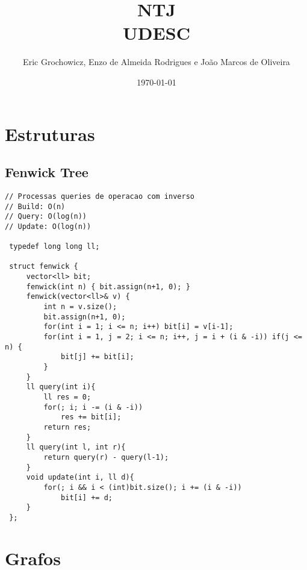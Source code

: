 \documentclass[11pt, a4paper, twoside]{article}
\title{NTJ \\ UDESC}
\author{Eric Grochowicz, Enzo de Almeida Rodrigues e João Marcos de Oliveira}
\begin{document}
\twocolumn
\date{\today}
\maketitle


\renewcommand{\contentsname}{Índice} %
\tableofcontents


%
%

\section{Estruturas}

\subsection{Fenwick Tree}
\begin{lstlisting}
// Processas queries de operacao com inverso
// Build: O(n)
// Query: O(log(n))
// Update: O(log(n))

 typedef long long ll;
 
 struct fenwick {
     vector<ll> bit;
     fenwick(int n) { bit.assign(n+1, 0); }
     fenwick(vector<ll>& v) {
         int n = v.size();
         bit.assign(n+1, 0);
         for(int i = 1; i <= n; i++) bit[i] = v[i-1];
         for(int i = 1, j = 2; i <= n; i++, j = i + (i & -i)) if(j <= n) {
             bit[j] += bit[i];
         }
     }
     ll query(int i){
         ll res = 0;
         for(; i; i -= (i & -i))
             res += bit[i];
         return res;
     }
     ll query(int l, int r){
         return query(r) - query(l-1);
     }
     void update(int i, ll d){
         for(; i && i < (int)bit.size(); i += (i & -i))
             bit[i] += d;
     }
 };
\end{lstlisting}



%
%

\section{Grafos}
\end{document}
